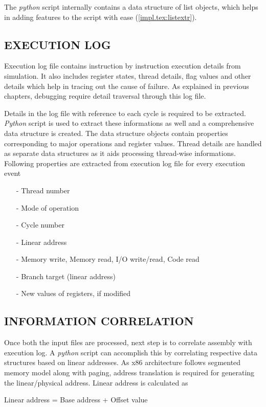 The {\it python} script internally contains a data structure of list objects, which helps in adding features to the script with ease (\figurename{\ref{impl.tex:listextr}}). 

\subsection {EXECUTION LOG}
Execution log file contains instruction by instruction execution details from simulation. It also includes register states, thread details, flag values and other details which help in tracing out the cause of failure. As explained in previous chapters, debugging require detail traversal through this log file. 

Details in the log file with reference to each cycle is required to be extracted. {\it Python} script is used to extract these informations as well and a comprehensive data structure is created. The data structure objects contain properties corresponding to major operations and register values. Thread details are handled as separate data structures as it aids processing thread-wise informations. Following properties are extracted from execution log file for every execution event


\begin{itemize}
 \item[-]  Thread number
 \item[-]  Mode of operation
 \item[-]  Cycle number
 \item[-]  Linear address
 \item[-]  Memory write, Memory read, I/O write/read, Code read
 \item[-]  Branch target (linear address)
 \item[-]  New values of registers, if modified
\end{itemize}


\subsection {INFORMATION CORRELATION}

Once both the input files are processed, next step is to correlate assembly with execution log. A {\it python} script can accomplish this by correlating respective data structures based on linear addresses. As x86 architecture follows segmented memory model along with paging, address translation is required for generating the linear/physical address\cite{SS:AMD64-V2}. Linear address is calculated as
\\
\centerline{Linear address = Base address + Offset value}
\\


